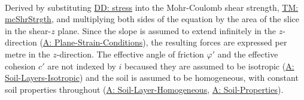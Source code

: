 \documentclass[12pt]{article}
\begin{document}
\paragraph{}
\label{GD:resShrDeriv}
Derived by substituting \hyperref[DD:stress]{DD: stress} into the Mohr-Coulomb shear strength, \hyperref[TM:mcShrStrgth]{TM: mcShrStrgth}, and multiplying both sides of the equation by the area of the slice in the shear-$z$ plane. Since the slope is assumed to extend infinitely in the $z$-direction (\hyperref[assumpPSC]{A: Plane-Strain-Conditions}), the resulting forces are expressed per metre in the $z$-direction. The effective angle of friction $φ'$ and the effective cohesion $c'$ are not indexed by $i$ becaused they are assumed to be isotropic (\hyperref[assumpSLI]{A: Soil-Layers-Isotropic}) and the soil is assumed to be homogeneous, with constant soil properties throughout (\hyperref[assumpSLH]{A: Soil-Layer-Homogeneous}, \hyperref[assumpSP]{A: Soil-Properties}).
\par~
\end{document}
